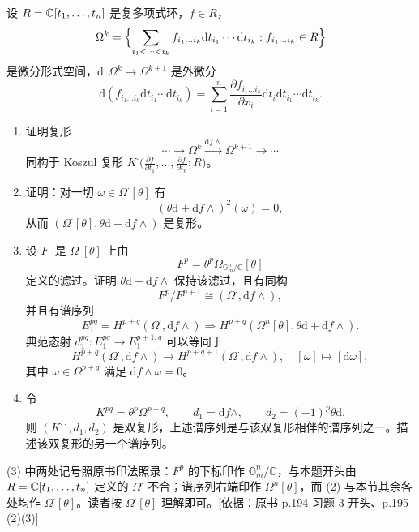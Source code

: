\begin{exercises}
\item \label{ex:2.4.3} 设 $R=\mathbb{C}[t_1,\dots,t_n]$ 是复多项式环，$f\in R$，
\[
\Omega^k=\Bigl\{\sum_{i_1<\cdots<i_k}f_{i_1\dots i_k}\mathrm{d}t_{i_1}\cdots\mathrm{d}t_{i_k}:f_{i_1\dots i_k}\in R\Bigr\}
\]
是微分形式空间，$\mathrm{d}\colon\Omega^k\to\Omega^{k+1}$ 是外微分
\[
\mathrm{d}(f_{i_1\dots i_k}\mathrm{d}t_{i_1}\cdots\mathrm{d}t_{i_k})
=\sum_{i=1}^{n}\frac{\partial f_{i_1\dots i_k}}{\partial x_i}\mathrm{d}t_i\mathrm{d}t_{i_1}\cdots\mathrm{d}t_{i_k}.
\]
\begin{enumerate}[label=(\arabic*),leftmargin=2.4em]
  \item 证明复形
  \[
  \cdots\to\Omega^k\xrightarrow{\mathrm{d}f\wedge}\Omega^{k+1}\to\cdots
  \]
  同构于 Koszul 复形 $K^{\cdot}\bigl(\frac{\partial f}{\partial t_1},\dots,\frac{\partial f}{\partial t_n};R\bigr)$。
  \item 证明：对一切 $\omega\in\Omega^{\cdot}[\theta]$ 有
  \[
  (\theta\mathrm{d}+\mathrm{d}f\wedge)^2(\omega)=0,
  \]
  从而 $(\Omega^{\cdot}[\theta],\theta\mathrm{d}+\mathrm{d}f\wedge)$ 是复形。
  \item 设 $F^{\cdot}$ 是 $\Omega^{\cdot}[\theta]$ 上由
  \[
  F^p=\theta^p\Omega^{\cdot}_{\mathbb G_m^n/\mathbb C}[\theta]
  \]
  定义的滤过。证明 $\theta\mathrm{d}+\mathrm{d}f\wedge$ 保持该滤过，且有同构
  \[
  F^p/F^{p+1}\cong(\Omega^{\cdot},\mathrm{d}f\wedge),
  \]
  并且有谱序列
  \[
  E_1^{pq}=H^{p+q}(\Omega^{\cdot},\mathrm{d}f\wedge)\Rightarrow H^{p+q}(\Omega^n[\theta],\theta\mathrm{d}+\mathrm{d}f\wedge).
  \]
  典范态射 $d_1^{pq}\colon E_1^{pq}\to E_1^{p+1,q}$ 可以等同于
  \[
  H^{p+q}(\Omega^{\cdot},\mathrm{d}f\wedge)\to H^{p+q+1}(\Omega^{\cdot},\mathrm{d}f\wedge),\quad[\omega]\mapsto[\mathrm{d}\omega],
  \]
  其中 $\omega\in\Omega^{p+q}$ 满足 $\mathrm{d}f\wedge\omega=0$。
  \item 令
  \[
  K^{pq}=\theta^p\Omega^{p+q},\qquad d_1=\mathrm{d}f\wedge,\qquad d_2=(-1)^p\theta\mathrm{d}.
  \]
  则 $(K^{\cdot\cdot},d_1,d_2)$ 是双复形，上述谱序列是与该双复形相伴的谱序列之一。描述该双复形的另一个谱序列。
\end{enumerate}

\begin{tnote}
(3) 中两处记号照原书印法照录：$F^p$ 的下标印作 $\mathbb G_m^n/\mathbb C$，与本题开头由 $R=\mathbb{C}[t_1,\dots,t_n]$ 定义的 $\Omega^{\cdot}$ 不合；谱序列右端印作 $\Omega^n[\theta]$，而 (2) 与本节其余各处均作 $\Omega^{\cdot}[\theta]$。读者按 $\Omega^{\cdot}[\theta]$ 理解即可。[依据：原书 p.194 习题 3 开头、p.195 (2)(3)]
\end{tnote}
\end{exercises}
\endgroup
